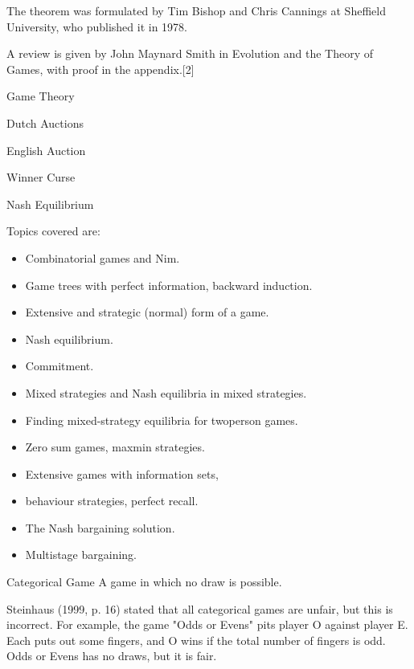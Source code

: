 \documentclass[]{report}
\begin{document}
The theorem was formulated by Tim Bishop and Chris Cannings at Sheffield University, who published it in 1978.

A review is given by John Maynard Smith in Evolution and the Theory of Games, with proof in the appendix.[2]


\newpage
	Game Theory

Dutch Auctions

English Auction

Winner Curse

Nash Equilibrium

Topics covered are:
\begin{multicols}{2}
\begin{itemize}
\item Combinatorial games and Nim.

\item Game trees with perfect information, backward induction.

\item Extensive and strategic (normal) form of a game.

\item Nash equilibrium.

\item Commitment.

\item Mixed strategies and Nash equilibria in mixed strategies.

\item Finding mixed-strategy equilibria for twoperson games.

\item Zero sum games, maxmin strategies.

\item Extensive games with information sets,

\item behaviour strategies, perfect recall.

\item The Nash bargaining solution.

\item Multistage bargaining.
\end{itemize}

\end{multicols}


Categorical Game
A game in which no draw is possible.

Steinhaus (1999, p. 16) stated that all categorical games are unfair, but this is incorrect. For example, the game "Odds or Evens" pits player O against player E. Each puts out some fingers, and O wins if the total number of fingers is odd. Odds or Evens has no draws, but it is fair.
\end{document}
